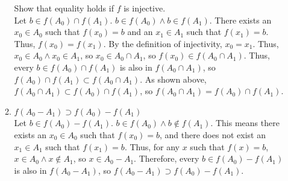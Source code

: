 \documentclass{article}
\begin{document}
\begin{enumerate}
\begin{enumerate}
                        Show that equality holds if $f$ is injective.\\
                        Let $b \in f(A_{0}) \cap f(A_{1})$. $b \in f(A_{0}) \land b \in f(A_{1})$. There exists an $x_{0} \in A_{0}$ such that $f(x_{0}) = b$ and an $x_{1} \in A_{1}$ such that $f(x_{1}) = b$. Thus, $f(x_{0}) = f(x_{1})$. By the definition of injectivity, $x_{0} = x_{1}$. Thus, $x_{0} \in A_{0} \land x_{0} \in A_{1}$, so $x_{0} \in A_{0} \cap A_{1}$, so $f(x_{0}) \in f(A_{0} \cap A_{1})$. Thus, every $b \in f(A_{0}) \cap f(A_{1})$ is also in $f(A_{0} \cap A_{1})$, so $f(A_{0}) \cap f(A_{1}) \subset f(A_{0} \cap A_{1})$. As shown above, $f(A_{0} \cap A_{1}) \subset f(A_{0}) \cap f(A_{1})$, so $f(A_{0} \cap A_{1}) = f(A_{0}) \cap f(A_{1})$.
                  \item $f(A_{0} - A_{1}) \supset f(A_{0}) - f(A_{1})$\\
                        Let $b \in f(A_{0}) - f(A_{1})$. $b \in f(A_{0}) \land b \notin f(A_{1})$. This means there exists an $x_{0} \in A_{0}$ such that $f(x_{0}) = b$, and there does not exist an $x_{1} \in A_{1}$ such that $f(x_{1}) = b$. Thus, for any $x$ such that $f(x) = b$, $x \in A_{0} \land x \notin A_{1}$, so $x \in A_{0} - A_{1}$. Therefore, every $b \in f(A_{0}) - f(A_{1})$ is also in $f(A_{0} - A_{1})$, so $f(A_{0} - A_{1}) \supset f(A_{0}) - f(A_{1})$.\\


\end{enumerate}
\end{enumerate}
\end{document}
